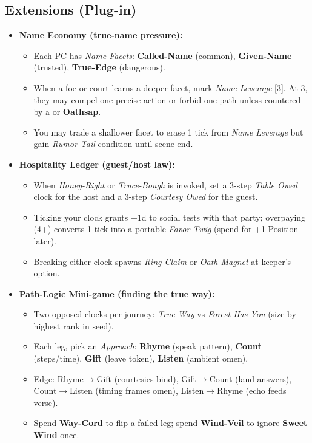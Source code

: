 \subsection*{Extensions (Plug-in)}
\label{sec:valewood-extensions}
\begin{itemize}
  \item \textbf{Name Economy (true-name pressure):}
  \begin{itemize}
    \item Each PC has \emph{Name Facets}: \textbf{Called-Name} (common), \textbf{Given-Name} (trusted), \textbf{True-Edge} (dangerous).
    \item When a foe or court learns a deeper facet, mark \emph{Name Leverage} [3]. At 3, they may compel one precise action or forbid one path unless countered by a \Diamond{} or \textbf{Oathsap}.
    \item You may trade a shallower facet to erase 1 tick from \emph{Name Leverage} but gain \emph{Rumor Tail} condition until scene end.
  \end{itemize}

  \item \textbf{Hospitality Ledger (guest/host law):}
  \begin{itemize}
    \item When \emph{Honey-Right} or \emph{Truce-Bough} is invoked, set a 3-step \emph{Table Owed} clock for the host and a 3-step \emph{Courtesy Owed} for the guest.
    \item Ticking your clock grants +1d to social tests with that party; overpaying (4+) converts 1 tick into a portable \emph{Favor Twig} (spend for +1 Position later).
    \item Breaking either clock spawns \emph{Ring Claim} or \emph{Oath-Magnet} at keeper's option.
  \end{itemize}

  \item \textbf{Path-Logic Mini-game (finding the true way):}
  \begin{itemize}
    \item Two opposed clocks per journey: \emph{True Way} vs \emph{Forest Has You} (size by highest rank in seed).
    \item Each leg, pick an \emph{Approach}: \textbf{Rhyme} (speak pattern), \textbf{Count} (steps/time), \textbf{Gift} (leave token), \textbf{Listen} (ambient omen).
    \item Edge: Rhyme\(\rightarrow\)Gift (courtesies bind), Gift\(\rightarrow\)Count (land answers), Count\(\rightarrow\)Listen (timing frames omen), Listen\(\rightarrow\)Rhyme (echo feeds verse).
    \item Spend \textbf{Way-Cord} to flip a failed leg; spend \textbf{Wind-Veil} to ignore \textbf{Sweet Wind} once.
  \end{itemize}


\end{itemize}
